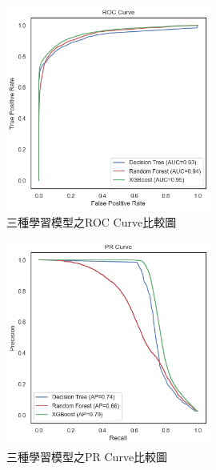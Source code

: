 \newpage

\begin{figure}[!htb]
    \begin{center}
      \includegraphics[width=0.6\textwidth]{figures/evaluation/Image_ModelsROCCurve.png}
      \caption[三種學習模型之ROC Curve比較圖]{三種學習模型之ROC Curve比較圖}
      \label{fig:eva_ModelsROCCurve}
    \end{center}
\end{figure}

\begin{figure}[!htb]
    \begin{center}
      \includegraphics[width=0.6\textwidth]{figures/evaluation/Image_ModelsPRCurve.png}
      \caption[三種學習模型之PR Curve比較圖]{三種學習模型之PR Curve比較圖}
      \label{fig:eva_ModelsPRCurve}
    \end{center}
\end{figure}
\newpage

